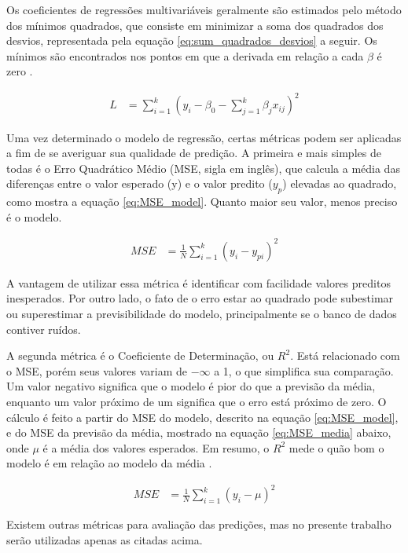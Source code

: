 \documentclass[brazil,tf,epusp]{usp}  %
\begin{document}
Os coeficientes de regressões multivariáveis geralmente são estimados pelo método dos mínimos quadrados, que consiste em minimizar a soma dos quadrados dos desvios, representada pela equação \ref{eq:sum_quadrados_desvios} a seguir. Os mínimos são encontrados nos pontos em que a derivada em relação a cada $\beta$ é zero \cite{Montgomery2013}.

\begin{align}
  L &=  \sum_{i=1}^k(y_i - \beta_0 - \sum_{j=1}^k  \beta_j x_{ij})^2
  \label{eq:sum_quadrados_desvios}
\end{align}

Uma vez determinado o modelo de regressão, certas métricas podem ser aplicadas a fim de se averiguar sua qualidade de predição. A primeira e mais simples de todas é o Erro Quadrático Médio (MSE, sigla em inglês), que calcula a média das diferenças entre o valor esperado (y) e o valor predito ($y_p$) elevadas ao quadrado, como mostra a equação \ref{eq:MSE_model}. Quanto maior seu valor, menos preciso é o modelo.

\begin{align}
  MSE &= \frac{1}{N} \sum_{i=1}^k(y_i - y_{pi})^2
  \label{eq:MSE_model}
\end{align}

A vantagem de utilizar essa métrica é identificar com facilidade valores preditos inesperados. Por outro lado, o fato de o erro estar ao quadrado pode subestimar ou superestimar a previsibilidade do modelo, principalmente se o banco de dados contiver ruídos.

A segunda métrica é o Coeficiente de Determinação, ou $R^{2}$. Está relacionado com o MSE, porém seus valores variam de $-\infty$ a 1, o que simplifica sua comparação. Um valor negativo significa que o modelo é pior do que a previsão da média, enquanto um valor próximo de um significa que o erro está próximo de zero. O cálculo é feito a partir do MSE do modelo, descrito na equação \ref{eq:MSE_model}, e do MSE da previsão da média, mostrado na equação \ref{eq:MSE_media} abaixo, onde $\mu$ é a média dos valores esperados. Em resumo, o $R^{2}$ mede o quão bom o modelo é em relação ao modelo da média \cite{Drakos2018}.

\begin{align}
  MSE &= \frac{1}{N} \sum_{i=1}^k(y_i - \mu)^2
  \label{eq:MSE_media}
\end{align}

Existem outras métricas para avaliação das predições, mas no presente trabalho serão utilizadas apenas as citadas acima.
\end{document}
